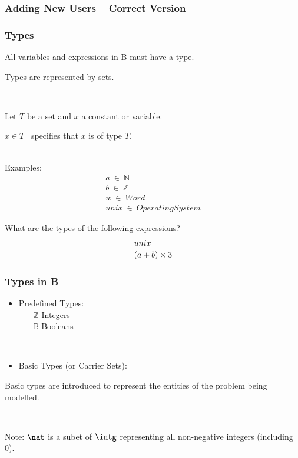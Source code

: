 \documentclass{beamer}
\begin{document}
\begin{frame}

\frametitle{Adding New Users -- Correct Version}




\end{frame}






\begin{frame}
\frametitle{Types}

All variables and expressions in B must have a \alert{type}.

Types are represented by sets.

~

Let $T$ be a set and $x$ a constant or variable.

\alert{$x \in T$}~ specifies that \alert{$x$ is of type $T$}.\\[2pt]

~

Examples:
\[\begin{array}{l}
    a~\in~\mathbb{N} \\
    b~\in~\mathbb{Z}\\
    w ~\in~ Word \\
    unix ~\in~ OperatingSystem
\end{array}\]

What are the types of the following expressions?
\[\begin{array}{l}
  unix \\ [2pt]
  (a+b)\times 3 
\end{array}\]

\end{frame}






\begin{frame}

\frametitle{Types in B}
\begin{itemize}
\item
Predefined Types:\\
$~~~~~~~~\mathbb{Z}$  Integers\\

$~~~~~~~~\mathbb{B}$  Booleans 

~

\item Basic Types (or Carrier Sets):\\
$~~~~~~~~$ 
\end{itemize}

Basic types are  introduced to represent the entities of the problem being modelled.

~

Note: $\nat$ is a subet of $\intg$ representing all non-negative integers (including 0).

\end{frame}
\end{document}
